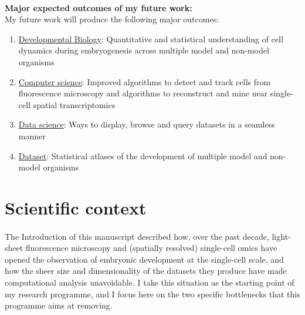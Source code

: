 

\paragraph{}\textbf{Major expected outcomes of my future work:}\\
My future work will produce the following major outcomes:
\noindent\begin{enumerate}
	\item \underline{Developmental Biology}: {Quantitative and statistical understanding of cell dynamics during embryogenesis across multiple model and non-model organisms}
	\item \underline{Computer science}: {Improved algorithms to detect and track cells from fluorescence microscopy and algorithms to reconstruct and mine near single-cell spatial transcriptomics}
	\item \underline{Data science}: {Ways to display, browse and query datasets in a seamless manner}
	\item \underline{Dataset}: {Statistical atlases of the development of multiple model and non-model organisms}
\end{enumerate}
\section{Scientific context}\label{sec:context}
\paragraph{}The Introduction of this manuscript described how, over the past decade, light-sheet fluorescence microscopy and (spatially resolved) single-cell omics have opened the observation of embryonic development at the single-cell scale, and how the sheer size and dimensionality of the datasets they produce have made computational analysis unavoidable.
I take this situation as the starting point of my research programme, and I focus here on the two specific bottlenecks that this programme aims at removing.
